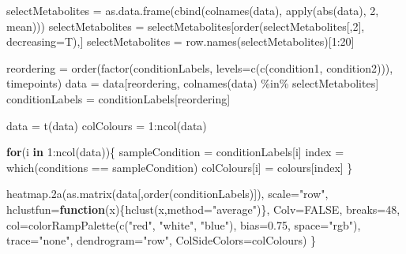 \documentclass[
]{article}
\newenvironment{Shaded}{\begin{snugshade}}{\end{snugshade}}
\newcommand{\AttributeTok}[1]{\textcolor[rgb]{0.77,0.63,0.00}{#1}}
\newcommand{\ConstantTok}[1]{\textcolor[rgb]{0.00,0.00,0.00}{#1}}
\newcommand{\ControlFlowTok}[1]{\textcolor[rgb]{0.13,0.29,0.53}{\textbf{#1}}}
\newcommand{\DecValTok}[1]{\textcolor[rgb]{0.00,0.00,0.81}{#1}}
\newcommand{\FloatTok}[1]{\textcolor[rgb]{0.00,0.00,0.81}{#1}}
\newcommand{\FunctionTok}[1]{\textcolor[rgb]{0.00,0.00,0.00}{#1}}
\newcommand{\NormalTok}[1]{#1}
\newcommand{\OtherTok}[1]{\textcolor[rgb]{0.56,0.35,0.01}{#1}}
\newcommand{\SpecialCharTok}[1]{\textcolor[rgb]{0.00,0.00,0.00}{#1}}
\newcommand{\StringTok}[1]{\textcolor[rgb]{0.31,0.60,0.02}{#1}}
\begin{document}
\begin{Shaded}
\begin{Highlighting}[]
\NormalTok{  selectMetabolites }\OtherTok{=} \FunctionTok{as.data.frame}\NormalTok{(}\FunctionTok{cbind}\NormalTok{(}\FunctionTok{colnames}\NormalTok{(data), }\FunctionTok{apply}\NormalTok{(}\FunctionTok{abs}\NormalTok{(data), }\DecValTok{2}\NormalTok{, mean)))}
\NormalTok{  selectMetabolites }\OtherTok{=}\NormalTok{ selectMetabolites[}\FunctionTok{order}\NormalTok{(selectMetabolites[,}\DecValTok{2}\NormalTok{], }\AttributeTok{decreasing=}\NormalTok{T),]}
\NormalTok{  selectMetabolites }\OtherTok{=} \FunctionTok{row.names}\NormalTok{(selectMetabolites)[}\DecValTok{1}\SpecialCharTok{:}\DecValTok{20}\NormalTok{]}
  
\NormalTok{  reordering }\OtherTok{=} \FunctionTok{order}\NormalTok{(}\FunctionTok{factor}\NormalTok{(conditionLabels, }\AttributeTok{levels=}\FunctionTok{c}\NormalTok{(}\FunctionTok{c}\NormalTok{(condition1, condition2))), timepoints)}
\NormalTok{  data }\OtherTok{=}\NormalTok{ data[reordering, }\FunctionTok{colnames}\NormalTok{(data) }\SpecialCharTok{\%in\%}\NormalTok{ selectMetabolites]}
\NormalTok{  conditionLabels }\OtherTok{=}\NormalTok{ conditionLabels[reordering]}
  
\NormalTok{  data }\OtherTok{=} \FunctionTok{t}\NormalTok{(data)}
\NormalTok{  colColours }\OtherTok{=} \DecValTok{1}\SpecialCharTok{:}\FunctionTok{ncol}\NormalTok{(data)}

  \ControlFlowTok{for}\NormalTok{(i }\ControlFlowTok{in} \DecValTok{1}\SpecialCharTok{:}\FunctionTok{ncol}\NormalTok{(data))\{}
\NormalTok{  sampleCondition }\OtherTok{=}\NormalTok{ conditionLabels[i]}
\NormalTok{  index }\OtherTok{=} \FunctionTok{which}\NormalTok{(conditions }\SpecialCharTok{==}\NormalTok{ sampleCondition)}
\NormalTok{  colColours[i] }\OtherTok{=}\NormalTok{ colours[index]}
\NormalTok{  \}}

  \FunctionTok{heatmap.2a}\NormalTok{(}\FunctionTok{as.matrix}\NormalTok{(data[,}\FunctionTok{order}\NormalTok{(conditionLabels)]), }\AttributeTok{scale=}\StringTok{"row"}\NormalTok{, }\AttributeTok{hclustfun=}\ControlFlowTok{function}\NormalTok{(x)\{}\FunctionTok{hclust}\NormalTok{(x,}\AttributeTok{method=}\StringTok{"average"}\NormalTok{)\}, }\AttributeTok{Colv=}\ConstantTok{FALSE}\NormalTok{, }\AttributeTok{breaks=}\DecValTok{48}\NormalTok{, }\AttributeTok{col=}\FunctionTok{colorRampPalette}\NormalTok{(}\FunctionTok{c}\NormalTok{(}\StringTok{"red"}\NormalTok{, }\StringTok{"white"}\NormalTok{, }\StringTok{"blue"}\NormalTok{), }\AttributeTok{bias=}\FloatTok{0.75}\NormalTok{, }\AttributeTok{space=}\StringTok{"rgb"}\NormalTok{), }\AttributeTok{trace=}\StringTok{"none"}\NormalTok{, }\AttributeTok{dendrogram=}\StringTok{"row"}\NormalTok{, }\AttributeTok{ColSideColors=}\NormalTok{colColours)}
\NormalTok{\}}
\end{Highlighting}
\end{Shaded}
\end{document}
